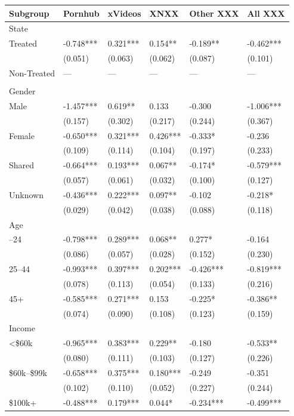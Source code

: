 
\begin{tabular}{llllll}
\toprule
Subgroup & Pornhub & xVideos & XNXX & Other XXX & All XXX\\
\midrule
State &  &  &  &  & \\
Treated & -0.748*** & 0.321*** & 0.154** & -0.189** & -0.462***\\
 & (0.051) & (0.063) & (0.062) & (0.087) & (0.101)\\
Non-Treated & — & — & — & — & —\\
 &  &  &  &  & \\
\addlinespace
Gender &  &  &  &  & \\
Male & -1.457*** & 0.619** & 0.133 & -0.300 & -1.006***\\
 & (0.157) & (0.302) & (0.217) & (0.244) & (0.367)\\
Female & -0.650*** & 0.321*** & 0.426*** & -0.333* & -0.236\\
 & (0.109) & (0.114) & (0.104) & (0.197) & (0.233)\\
\addlinespace
Shared & -0.664*** & 0.193*** & 0.067** & -0.174* & -0.579***\\
 & (0.057) & (0.061) & (0.032) & (0.100) & (0.127)\\
Unknown & -0.436*** & 0.222*** & 0.097** & -0.102 & -0.218*\\
 & (0.029) & (0.042) & (0.038) & (0.088) & (0.118)\\
Age &  &  &  &  & \\
\addlinespace
18–24 & -0.798*** & 0.289*** & 0.068** & 0.277* & -0.164\\
 & (0.086) & (0.057) & (0.028) & (0.152) & (0.230)\\
25–44 & -0.993*** & 0.397*** & 0.202*** & -0.426*** & -0.819***\\
 & (0.078) & (0.113) & (0.054) & (0.133) & (0.216)\\
45+ & -0.585*** & 0.271*** & 0.153 & -0.225* & -0.386**\\
\addlinespace
 & (0.074) & (0.090) & (0.108) & (0.123) & (0.159)\\
Income &  &  &  &  & \\
<\$60k & -0.965*** & 0.383*** & 0.229** & -0.180 & -0.533**\\
 & (0.080) & (0.111) & (0.103) & (0.127) & (0.226)\\
\$60k–\$99k & -0.658*** & 0.375*** & 0.180*** & -0.249 & -0.351\\
\addlinespace
 & (0.102) & (0.110) & (0.052) & (0.227) & (0.244)\\
\$100k+ & -0.488*** & 0.179*** & 0.044* & -0.234*** & -0.499***\\

\end{tabular}

